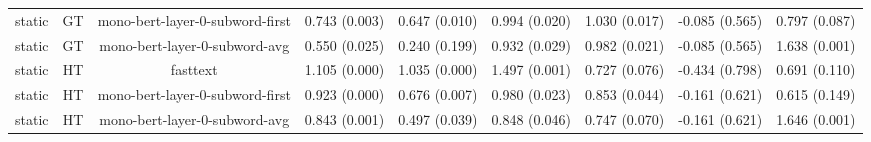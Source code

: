 \begin{sidewaystable}[htb]
\begin{tabular}{@{}ccccccccc@{}}
        static & GT & mono-bert-layer-0-subword-first & 0.743 (0.003) & 0.647 (0.010) & 0.994 (0.020) & 1.030 (0.017) & -0.085 (0.565) & 0.797 (0.087) \\
        static & GT & mono-bert-layer-0-subword-avg & 0.550 (0.025) & 0.240 (0.199) & 0.932 (0.029) & 0.982 (0.021) & -0.085 (0.565) & 1.638 (0.001) \\
        static & HT & fasttext & 1.105 (0.000) & 1.035 (0.000) & 1.497 (0.001) & 0.727 (0.076) & -0.434 (0.798) & 0.691 (0.110) \\
        static & HT & mono-bert-layer-0-subword-first & 0.923 (0.000) & 0.676 (0.007) & 0.980 (0.023) & 0.853 (0.044) & -0.161 (0.621) & 0.615 (0.149) \\
        static & HT & mono-bert-layer-0-subword-avg & 0.843 (0.001) & 0.497 (0.039) & 0.848 (0.046) & 0.747 (0.070) & -0.161 (0.621) & 1.646 (0.001) \\
        \bottomrule
    \end{tabular}
\end{sidewaystable}